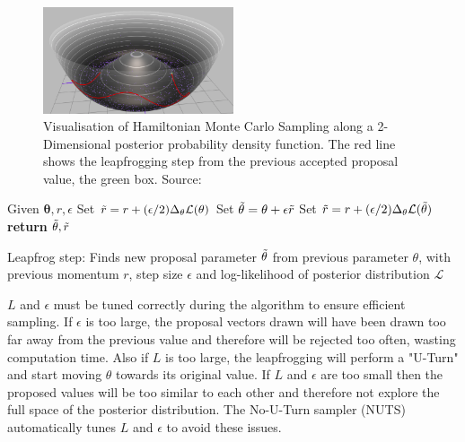 \documentclass[ %
                    author={Tom Jager},
                supervisor={Dr. Daniel Schien},
                    degree={MEng},
                     title={A Bayesian Inference Engine for UMIS Structured Data},
                  subtitle={},
                      type={research},
                      year={2019} ]{dissertation}
\begin{document}
\begin{figure}[]
\centering
\includegraphics[width=0.5\textwidth]{images/hamiltonian_mcmc.png}
\caption{Visualisation of Hamiltonian Monte Carlo Sampling along a 2-Dimensional posterior probability density function. The red line shows the leapfrogging step from the previous accepted proposal value, the green box. Source: \cite{rogozhnikov_2016}}
\label{fig:umis_aspects}
\end{figure}

\begin{algorithm}[]
Given $\bm{\theta}, r, \epsilon$\;
\;
Set $\Tilde{r} = r + (\epsilon/2)\Delta_\theta\mathcal{L}(\theta)$\;
Set $\Tilde{\theta} = \theta + \epsilon \Tilde{r}$\;
Set $\Tilde{r} = r + (\epsilon/2)\Delta_\theta\mathcal{L}(\Tilde{\theta})$\;
\textbf{return} $\Tilde{\theta}, \Tilde{r}$\;
\caption{Leapfrog step: \newline Finds new proposal parameter $\Tilde{\theta}$ from previous parameter $\theta$, with previous momentum $r$, step size $\epsilon$ and log-likelihood of posterior distribution $\mathcal{L}$}
    \label{alg:leapfrog}
\end{algorithm}

$L$ and $\epsilon$ must be tuned correctly during the algorithm to ensure efficient sampling. If $\epsilon$ is too large, the proposal vectors drawn will have been drawn too far away from the previous value and therefore will be rejected too often, wasting computation time. Also if $L$ is too large, the leapfrogging will perform a "U-Turn" and start moving $\theta$ towards its original value. If $L$ and $\epsilon$ are too small then the proposed values will be too similar to each other and therefore not explore the full space of the posterior distribution. The No-U-Turn sampler (NUTS) \cite{hoffman2014no} automatically tunes $L$ and $\epsilon$ to avoid these issues.
\end{document}
